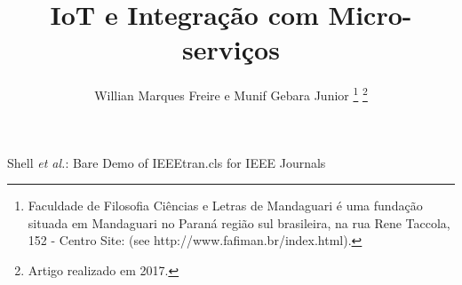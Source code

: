 \documentclass[journal]{IEEEtran}
\begin{document}
%
\title{IoT e Integração com Micro-serviços}
%
%
%

\author{Willian Marques Freire e
        Munif Gebara Junior%
\thanks{Faculdade de Filosofia Ciências e Letras de Mandaguari é uma fundação
situada em Mandaguari no Paraná região sul brasileira,
na rua Rene Taccola, 152 - Centro Site: (see http://www.fafiman.br/index.html).}%
\thanks{Artigo realizado em 2017.}}

% 
%



%
{Shell \MakeLowercase{\textit{et al.}}: Bare Demo of IEEEtran.cls for IEEE Journals}
% 
\end{document}
